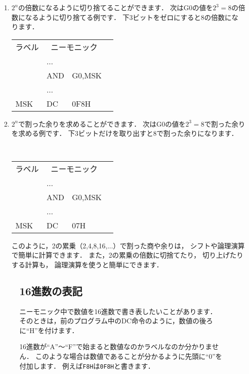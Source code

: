 \begin{enumerate}
\begin{center}
\end{center}

\item $2^n$の倍数になるように切り捨てることができます．
次はG0の値を$2^3=8$の倍数になるように切り捨てる例です．
下3ビットをゼロにすると8の倍数になります．

{\small\tt\begin{center}
\begin{tabular}{|l|l l|l}
\cline{1-3}
ラベル & \multicolumn{2}{|c|}{ニーモニック} & \\
\cline{1-3}
    & ...  &        & \\
    & AND  & G0,MSK & \\
    & ...  &        & \\
MSK & DC   & 0F8H   & \\
\cline{1-3}
\end{tabular}
\end{center}}

\item $2^n$で割った余りを求めることができます．
次はG0の値を$2^3=8$で割った余りを求める例です．
下3ビットだけを取り出すと8で割った余りになります．

\begin{center}
{\small\tt
\begin{tabular}{|l|l l|l}
\cline{1-3}
ラベル & \multicolumn{2}{|c|}{ニーモニック} & \\
\cline{1-3}
    & ...  &        & \\
    & AND  & G0,MSK & \\
    & ...  &        & \\
MSK & DC   & 07H    & \\
\cline{1-3}
\end{tabular}
}
\end{center}

\vspace{1ex}
このように，2の累乗（2,4,8,16,...）で割った商や余りは，
シフトや論理演算で簡単に計算できます．
また，2の累乗の倍数に切捨てたり，
切り上げたりする計算も，
論理演算を使うと簡単にできます．

\end{enumerate}

\begin{figure}[btp]
\begin{framed}
\subsection*{16進数の表記}
ニーモニック中で数値を16進数で書き表したいことがあります．
そのときは，前のプログラム中のDC命令のように，数値の後ろに``H''を付けます．

16進数が``A''〜``F''で始まると数値なのかラベルなのか分かりません．
このような場合は数値であることが分かるように先頭に``0''を付加します．
例えば{\tt F8H}は{\tt 0F8H}と書きます．
\end{framed}
\end{figure}

